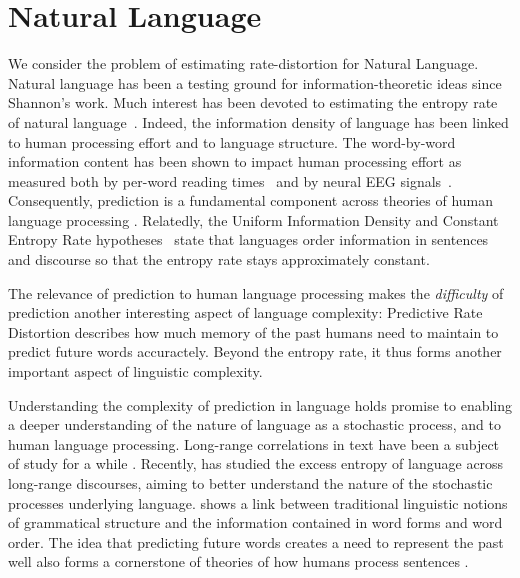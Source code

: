 \documentclass[11pt,letterpaper]{article}
\begin{document}
\section{Natural Language}\label{sec:language}

We consider the problem of estimating rate-distortion for Natural Language.
Natural language has been a testing ground for information-theoretic ideas since Shannon's work.
Much interest has been devoted to estimating the entropy rate of natural language~\citep{shannon1951prediction,takahira2016entropy,bentz2017entropy,takahashi2018cross}.
Indeed, the information density of language has been linked to human processing effort and to language structure.
The word-by-word information content has been shown to impact human processing effort as measured both by per-word reading times~\citep{hale-probabilistic-2001,levy-expectation-based-2008,smith-effect-2013} and by neural EEG signals~\citep{DBLP:conf/acl/FrankOGV13, kuperberg2016we}.
Consequently, prediction is a fundamental component across theories of human language processing  \citep{kuperberg2016we}.
Relatedly, the Uniform Information Density and Constant Entropy Rate hypotheses~\citep{fenk1980konstanz, genzel2002entropy, jaeger2007speakers} state that languages order information in sentences and discourse so that the entropy rate stays approximately constant. %

The relevance of prediction to human language processing makes the \emph{difficulty} of prediction another interesting aspect of language complexity:
Predictive Rate Distortion describes how much memory of the past humans need to maintain to predict future words accuractely.
Beyond the entropy rate, it thus forms another important aspect of linguistic complexity.


Understanding the complexity of prediction in language holds promise to enabling a deeper understanding of the nature of language as a stochastic process, and to human language processing.
Long-range correlations in text have been a subject of study for a while \citep{schenkel1993long,ebeling1994entropy,ebeling1995long,altmann2012origin,yang2016long,chen2018quantifying}.
Recently, \cite{dkebowski2018natural} has studied the excess entropy of language across long-range discourses, aiming to better understand the nature of the stochastic processes underlying language.
\cite{koplenig2017statistical} shows a link between traditional linguistic notions of grammatical structure and the information contained in word forms and word order.
The idea that predicting future words creates a need to represent the past well also forms a cornerstone of theories of how humans process sentences \citep{gibson-linguistic-1998,futrell-noisy-context-2017}.
\end{document}
